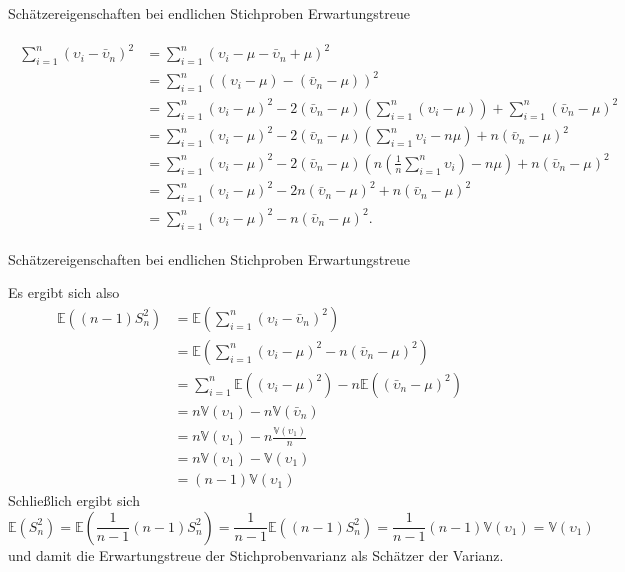 \documentclass[
  8pt,
  ignorenonframetext,
]{beamer}
\newcommand{\ups} {\upsilon}
\begin{document}
\begin{frame}{\small Schätzereigenschaften bei endlichen Stichproben
\textbar{} Erwartungstreue}
\protect\hypertarget{schuxe4tzereigenschaften-bei-endlichen-stichproben-erwartungstreue-3}{}
\vspace{-2mm}
\footnotesize

\begin{align}
\begin{split}
\sum_{i=1}^n \left(\ups_i - \bar{\ups}_n\right)^2
& = \sum_{i=1}^n \left(\ups_i - \mu - \bar{\ups}_n + \mu \right)^2 \\
& = \sum_{i=1}^n \left((\ups_i - \mu) - (\bar{\ups}_n - \mu) \right)^2 \\
& = \sum_{i=1}^n (\ups_i-\mu)^2 - 2(\bar{\ups}_n-\mu)\left(\sum_{i=1}^n(\ups_i-\mu)\right) + \sum_{i=1}^n (\bar{\ups}_n-\mu)^2 \\
& = \sum_{i=1}^n (\ups_i-\mu)^2 - 2(\bar{\ups}_n-\mu)\left(\sum_{i=1}^n\ups_i- n\mu\right) + n(\bar{\ups}_n-\mu)^2 \\
& = \sum_{i=1}^n (\ups_i-\mu)^2 - 2(\bar{\ups}_n-\mu)\left(n\left(\frac{1}{n}\sum_{i=1}^n\ups_i\right)- n\mu\right) + n(\bar{\ups}_n-\mu)^2 \\
& = \sum_{i=1}^n (\ups_i-\mu)^2 - 2n(\bar{\ups}_n-\mu)^2 + n(\bar{\ups}_n-\mu)^2 \\
& = \sum_{i=1}^n (\ups_i - \mu)^2 - n(\bar{\ups}_n - \mu)^2.
\end{split}
\end{align} \vfill
\end{frame}

\begin{frame}{\small Schätzereigenschaften bei endlichen Stichproben
\textbar{} Erwartungstreue}
\protect\hypertarget{schuxe4tzereigenschaften-bei-endlichen-stichproben-erwartungstreue-4}{}
\footnotesize

Es ergibt sich also \vspace{-1mm} \footnotesize \begin{align*}
\mathbb{E}\left((n-1)S^2_n\right)
& = \mathbb{E}\left(\sum_{i=1}^n \left(\ups_i - \bar{\ups}_n\right)^2 \right) \\
& = \mathbb{E}\left(\sum_{i=1}^n (\ups_i - \mu)^2 - n(\bar{\ups}_n - \mu)^2 \right) \\
& = \sum_{i=1}^n \mathbb{E}\left((\ups_i - \mu)^2\right) - n \mathbb{E}\left((\bar{\ups}_n - \mu)^2 \right) \\
& = n \mathbb{V}(\ups_1) - n \mathbb{V}(\bar{\ups}_n) \\
& = n \mathbb{V}(\ups_1) - n \frac{\mathbb{V}(\ups_1)}{n} \\
& = n \mathbb{V}(\ups_1) - \mathbb{V}(\ups_1) \\
& = (n - 1) \mathbb{V}(\ups_1)
\end{align*} Schließlich ergibt sich \footnotesize \begin{equation*}
\mathbb{E}(S^2_n)
= \mathbb{E}\left(\frac{1}{n-1}(n-1)S^2_n \right)
= \frac{1}{n-1}\mathbb{E}\left((n-1)S^2_n \right)
= \frac{1}{n-1}(n - 1)  \mathbb{V}(\ups_1)
= \mathbb{V}(\ups_1)
\end{equation*} und damit die Erwartungstreue der Stichprobenvarianz als
Schätzer der Varianz.
\end{frame}
\end{document}
